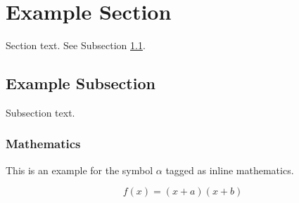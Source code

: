 \documentclass[preprint,12pt]{elsarticle}
\begin{document}


\section{Example Section}
\label{sec1}

Section text. See Subsection \ref{subsec1}.

\subsection{Example Subsection}
\label{subsec1}

Subsection text.


\subsubsection{Mathematics}
This is an example for the symbol $\alpha$ tagged as inline mathematics.

\begin{equation}
f(x) = (x+a)(x+b)
\end{equation}
\end{document}
